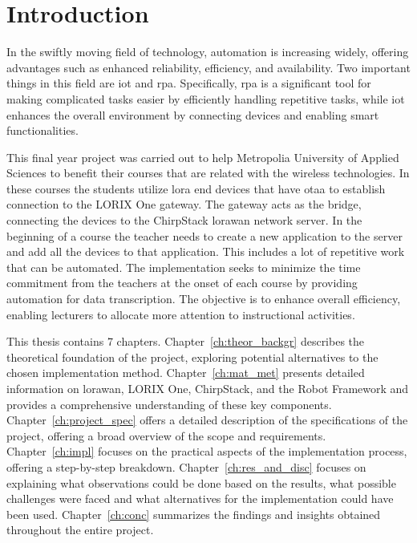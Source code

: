 
\chapter{Introduction}

In the swiftly moving field of technology, automation is increasing widely, offering advantages such as enhanced reliability, efficiency, and availability.
Two important things in this field are  \gls{iot} and \gls{rpa}. Specifically, \gls{rpa} is a significant tool for making complicated tasks easier by efficiently handling repetitive tasks, while \gls{iot} enhances the overall environment by connecting devices and enabling smart functionalities. 

This final year project was carried out to help Metropolia University of Applied Sciences to benefit their courses that are related with the wireless technologies.
In these courses the students utilize \gls{lora} end devices that have \gls{otaa} to establish connection to the LORIX One gateway.
The gateway acts as the bridge, connecting the devices to the ChirpStack \gls{lorawan} network server.
In the beginning of a course the teacher needs to create a new application to the server and add all the devices to that application.
This includes a lot of repetitive work that can be automated.
The implementation seeks to minimize the time commitment from the teachers at the onset of each course by providing automation for data transcription.
The objective is to enhance overall efficiency, enabling lecturers to allocate more attention to instructional activities.

This thesis contains 7 chapters.
Chapter~\ref{ch:theor_backgr} describes the theoretical foundation of the project, exploring potential alternatives to the chosen implementation method.
Chapter~\ref{ch:mat_met} presents detailed information on \gls{lorawan}, LORIX One, ChirpStack, and the Robot Framework and provides a comprehensive understanding of these key components.
Chapter~\ref{ch:project_spec} offers a detailed description of the  specifications of the project, offering a broad overview of the scope and requirements. 
Chapter~\ref{ch:impl} focuses on the practical aspects of the implementation process, offering a step-by-step breakdown.
Chapter~\ref{ch:res_and_disc} focuses on explaining what observations could be done based on the results, what possible challenges were faced and what alternatives for the implementation could have been used.
Chapter~\ref{ch:conc} summarizes the findings and insights obtained throughout the entire project.


\clearpage %
